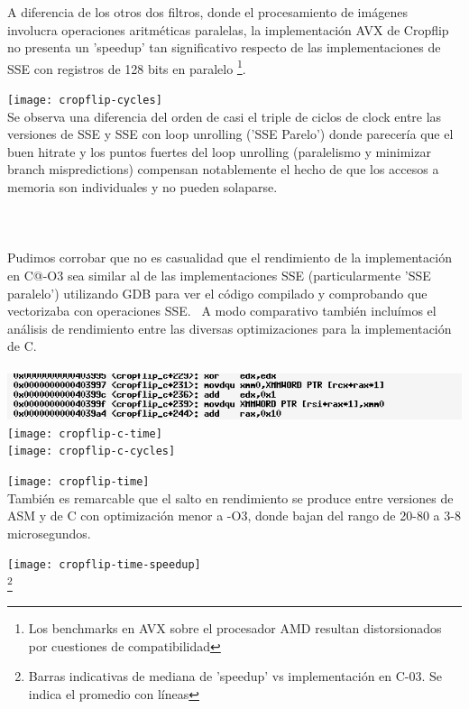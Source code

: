 A diferencia de los otros dos filtros, donde el procesamiento de imágenes involucra operaciones aritméticas paralelas, la implementación AVX de	 Cropflip no presenta un 'speedup' tan significativo respecto de las implementaciones de SSE con registros de 128 bits en paralelo \footnote{Los benchmarks en AVX sobre el procesador AMD resultan distorsionados por cuestiones de compatibilidad}. 

\texttt{[image: cropflip-cycles]} 
\\


Se observa una diferencia del orden de casi el triple de ciclos de clock entre las versiones de SSE y SSE con loop unrolling ('SSE Parelo') donde parecería que el buen hitrate y los puntos fuertes del loop unrolling (paralelismo y minimizar branch mispredictions) compensan notablemente el hecho de que los accesos a memoria son individuales y no pueden solaparse.
\\
\\
\\
\\

Pudimos corrobar que no es casualidad que el rendimiento de la implementación en C@-O3 sea similar al de las implementaciones SSE (particularmente 'SSE paralelo') utilizando GDB para ver el código compilado y comprobando que vectorizaba con operaciones SSE.
\ A modo comparativo también incluímos el análisis de rendimiento entre las diversas optimizaciones para la implementación de C.
\\
\\
\includegraphics[width=15cm]{untitled}
\\
\texttt{[image: cropflip-c-time]}
\\
\texttt{[image: cropflip-c-cycles]} 

\texttt{[image: cropflip-time]}
\\
También es remarcable que el salto en rendimiento se produce entre versiones de ASM y de C con optimización menor a -O3, donde bajan del rango de 20-80 a 3-8 microsegundos.

\texttt{[image: cropflip-time-speedup]} 
\\
	\footnote{Barras indicativas de mediana de 'speedup' vs implementación en C-03. Se indica el promedio con líneas}


